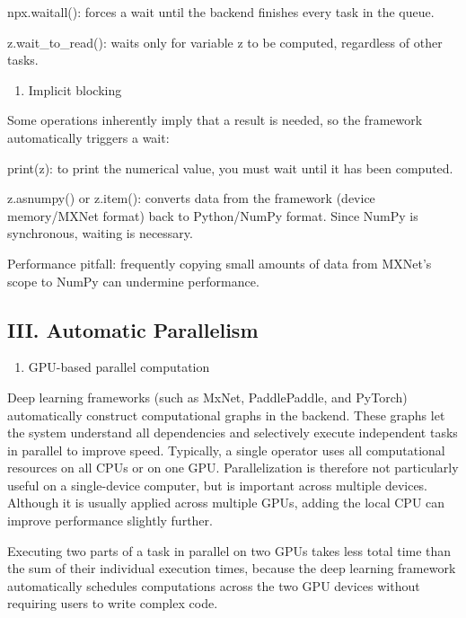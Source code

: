 npx.waitall(): forces a wait until the backend finishes every task in the queue.

z.wait\_to\_read(): waits only for variable z to be computed, regardless of other tasks.

\begin{enumerate}
\def\labelenumi{(\arabic{enumi})}
\setcounter{enumi}{1}
\tightlist
\item
  Implicit blocking
\end{enumerate}

Some operations inherently imply that a result is needed, so the framework automatically triggers a wait:

print(z): to print the numerical value, you must wait until it has been computed.

z.asnumpy() or z.item(): converts data from the framework (device memory/MXNet format) back to Python/NumPy format. Since NumPy is synchronous, waiting is necessary.

Performance pitfall: frequently copying small amounts of data from MXNet's scope to NumPy can undermine performance.

\hypertarget{iii.-automatic-parallelism}{%
\subsection{III. Automatic Parallelism}\label{iii.-automatic-parallelism}}

\begin{enumerate}
\def\labelenumi{\arabic{enumi}.}
\tightlist
\item
  GPU-based parallel computation
\end{enumerate}

Deep learning frameworks (such as MxNet, PaddlePaddle, and PyTorch) automatically construct computational graphs in the backend. These graphs let the system understand all dependencies and selectively execute independent tasks in parallel to improve speed. Typically, a single operator uses all computational resources on all CPUs or on one GPU. Parallelization is therefore not particularly useful on a single-device computer, but is important across multiple devices. Although it is usually applied across multiple GPUs, adding the local CPU can improve performance slightly further.

Executing two parts of a task in parallel on two GPUs takes less total time than the sum of their individual execution times, because the deep learning framework automatically schedules computations across the two GPU devices without requiring users to write complex code.

